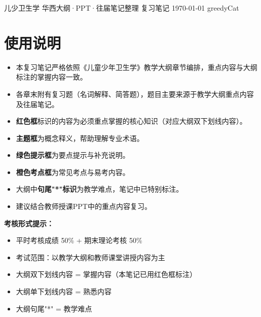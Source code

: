\documentclass[10pt,a4paper,oneside]{ctexbook}
\begin{document}
\makecover
  {儿少卫生学}
  {华西大纲·PPT·往届笔记整理}
  {复习笔记}
  {\today}
  {greedyCat}

\tableofcontents

\chapter*{使用说明}

\begin{itemize}[leftmargin=*]
    \item 本复习笔记严格依照《儿童少年卫生学》教学大纲章节编排，重点内容与大纲标注的掌握内容一致。
    \item 各章末附有复习题（名词解释、简答题），题目主要来源于教学大纲重点内容及往届笔记。
    \item \textbf{\color{keyred}红色框}标识的内容为必须重点掌握的核心知识（对应大纲双下划线内容）。
    \item \textbf{\color{main}主题框}为概念释义，帮助理解专业术语。
    \item \textbf{\color{darkgreen}绿色提示框}为要点提示与补充说明。
    \item \textbf{\color{orange}橙色考点框}为常见考点与易考内容。
    \item 大纲中\textbf{句尾"*"标识}为教学难点，笔记中已特别标注。
    \item 建议结合教师授课PPT中的重点内容复习。
\end{itemize}

\vspace{1cm}
\begin{center}
\begin{tcolorbox}[colback=yellow!10, colframe=yellow!80!black, boxrule=0.8pt, arc=6pt, width=0.85\textwidth, breakable]
\textbf{考核形式提示：}
\begin{itemize}[leftmargin=*]
    \item 平时考核成绩 50\% + 期末理论考核 50\%
    \item 考试范围：以教学大纲和教师课堂讲授内容为主
    \item 大纲双下划线内容 = 掌握内容（本笔记已用红色框标注）
    \item 大纲单下划线内容 = 熟悉内容
    \item 大纲句尾"*" = 教学难点
\end{itemize}
\end{tcolorbox}
\end{center}
\end{document}
